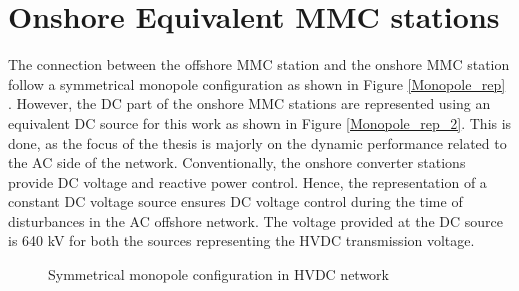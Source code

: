 \section{Onshore Equivalent MMC stations}
The connection between the offshore \gls{MMC} station and the onshore \gls{MMC} station follow a symmetrical monopole configuration as shown in Figure \ref{Monopole_rep} \cite{sharifabadi2016design}. However, the \gls{DC} part of the onshore \gls{MMC} stations are represented using an equivalent \gls{DC} source for this work as shown in Figure \ref{Monopole_rep_2}. This is done, as the focus of the thesis is majorly on the dynamic performance related to the \gls{AC} side of the network. Conventionally, the onshore converter stations provide \gls{DC} voltage and reactive power control. Hence, the representation of a constant \gls{DC} voltage source ensures \gls{DC} voltage control during the time of disturbances in the \gls{AC} offshore network. The voltage provided at the \gls{DC} source is 640 kV for both the sources representing the \gls{HVDC} transmission voltage.  



\begin{figure}[H]
\centering





\caption{Symmetrical monopole configuration in HVDC network}

\end{figure}



